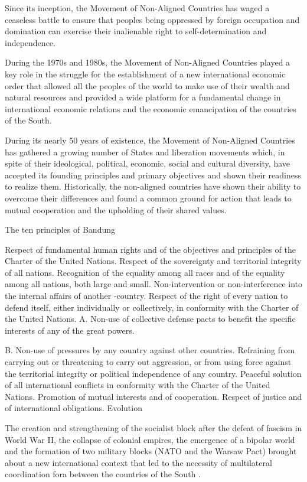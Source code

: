 \documentclass[
  openany]{book}
\begin{document}
Since its inception, the Movement of Non-Aligned Countries has waged a ceaseless battle to ensure that peoples being oppressed by foreign occupation and domination can exercise their inalienable right to self-determination and independence.

During the 1970s and 1980s, the Movement of Non-Aligned Countries played a key role in the struggle for the establishment of a new international economic order that allowed all the peoples of the world to make use of their wealth and natural resources and provided a wide platform for a fundamental change in international economic relations and the economic emancipation of the countries of the South.

During its nearly 50 years of existence, the Movement of Non-Aligned Countries has gathered a growing number of States and liberation movements which, in spite of their ideological, political, economic, social and cultural diversity, have accepted its founding principles and primary objectives and shown their readiness to realize them. Historically, the non-aligned countries have shown their ability to overcome their differences and found a common ground for action that leads to mutual cooperation and the upholding of their shared values.

The ten principles of Bandung

Respect of fundamental human rights and of the objectives and principles of the Charter of the United Nations.
Respect of the sovereignty and territorial integrity of all nations.
Recognition of the equality among all races and of the equality among all nations, both large and small.
Non-intervention or non-interference into the internal affairs of another -country.
Respect of the right of every nation to defend itself, either individually or collectively, in conformity with the Charter of the United Nations.
A. Non-use of collective defense pacts to benefit the specific interests of any of the great powers.

B. Non-use of pressures by any country against other countries.
Refraining from carrying out or threatening to carry out aggression, or from using force against the territorial integrity or political independence of any country.
Peaceful solution of all international conflicts in conformity with the Charter of the United Nations.
Promotion of mutual interests and of cooperation.
Respect of justice and of international obligations.
Evolution

The creation and strengthening of the socialist block after the defeat of fascism in World War II, the collapse of colonial empires, the emergence of a bipolar world and the formation of two military blocks (NATO and the Warsaw Pact) brought about a new international context that led to the necessity of multilateral coordination fora between the countries of the South .
\end{document}
